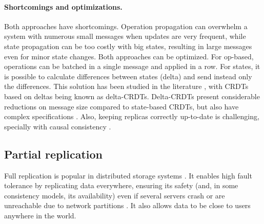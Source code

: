 \paragraph{Shortcomings and optimizations.}
Both approaches have shortcomings.
Operation propagation can overwhelm a system with numerous small messages when updates are very frequent, while state propagation can be too costly with big states, resulting in large messages even for minor state changes.
Both approaches can be optimized.
For op-based, operations can be batched in a single message and applied in a row.
For states, it is possible to calculate differences between states (delta) and send instead only the differences. 
This solution has been studied in the literature \cite{deltaAlmeida, deltaVan}, with CRDTs based on deltas being known as delta-CRDTs. Delta-CRDTs present considerable reductions on message size compared to state-based CRDTs, but also have complex specifications \cite{deltaAlmeida}. 
Also, keeping replicas correctly up-to-date is challenging, specially with causal consistency \cite{deltaAlmeida}.

\subsection{Partial replication}
\label{subsec:partial}


Full replication is popular in distributed storage systems \cite{sipre, practi}.
It enables high fault tolerance by replicating data everywhere, ensuring its safety (and, in some consistency models, its availability) even if several servers crash or are unreachable due to network partitions \cite{cure,epoch,asymmetric}.
It also allows data to be close to users
anywhere in the world.


